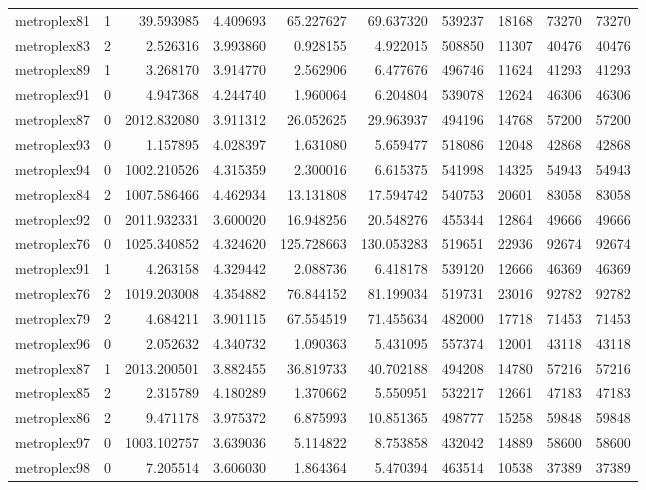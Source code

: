 \begin{longtable}{|l|r|r|r|r|r|r|r|r|r|}
metroplex81 & 1 & 39.593985 & 4.409693 & 65.227627 & 69.637320 & 539237 & 18168 & 73270 & 73270 \\
metroplex83 & 2 & 2.526316 & 3.993860 & 0.928155 & 4.922015 & 508850 & 11307 & 40476 & 40476 \\
metroplex89 & 1 & 3.268170 & 3.914770 & 2.562906 & 6.477676 & 496746 & 11624 & 41293 & 41293 \\
metroplex91 & 0 & 4.947368 & 4.244740 & 1.960064 & 6.204804 & 539078 & 12624 & 46306 & 46306 \\
metroplex87 & 0 & 2012.832080 & 3.911312 & 26.052625 & 29.963937 & 494196 & 14768 & 57200 & 57200 \\
metroplex93 & 0 & 1.157895 & 4.028397 & 1.631080 & 5.659477 & 518086 & 12048 & 42868 & 42868 \\
metroplex94 & 0 & 1002.210526 & 4.315359 & 2.300016 & 6.615375 & 541998 & 14325 & 54943 & 54943 \\
metroplex84 & 2 & 1007.586466 & 4.462934 & 13.131808 & 17.594742 & 540753 & 20601 & 83058 & 83058 \\
metroplex92 & 0 & 2011.932331 & 3.600020 & 16.948256 & 20.548276 & 455344 & 12864 & 49666 & 49666 \\
metroplex76 & 0 & 1025.340852 & 4.324620 & 125.728663 & 130.053283 & 519651 & 22936 & 92674 & 92674 \\
metroplex91 & 1 & 4.263158 & 4.329442 & 2.088736 & 6.418178 & 539120 & 12666 & 46369 & 46369 \\
metroplex76 & 2 & 1019.203008 & 4.354882 & 76.844152 & 81.199034 & 519731 & 23016 & 92782 & 92782 \\
metroplex79 & 2 & 4.684211 & 3.901115 & 67.554519 & 71.455634 & 482000 & 17718 & 71453 & 71453 \\
metroplex96 & 0 & 2.052632 & 4.340732 & 1.090363 & 5.431095 & 557374 & 12001 & 43118 & 43118 \\
metroplex87 & 1 & 2013.200501 & 3.882455 & 36.819733 & 40.702188 & 494208 & 14780 & 57216 & 57216 \\
metroplex85 & 2 & 2.315789 & 4.180289 & 1.370662 & 5.550951 & 532217 & 12661 & 47183 & 47183 \\
metroplex86 & 2 & 9.471178 & 3.975372 & 6.875993 & 10.851365 & 498777 & 15258 & 59848 & 59848 \\
metroplex97 & 0 & 1003.102757 & 3.639036 & 5.114822 & 8.753858 & 432042 & 14889 & 58600 & 58600 \\
metroplex98 & 0 & 7.205514 & 3.606030 & 1.864364 & 5.470394 & 463514 & 10538 & 37389 & 37389 \\

\end{longtable}
